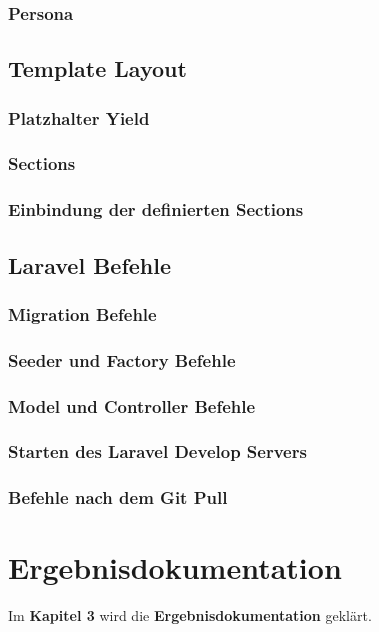 \subsection{Persona}


\section{Template Layout}

\subsection{Platzhalter Yield}

\subsection{Sections}
\subsection{Einbindung der definierten Sections}


\section{Laravel Befehle}

\subsection{Migration Befehle}
\subsection{Seeder und Factory Befehle}
\subsection{Model und Controller Befehle}
\subsection{Starten des Laravel Develop Servers}
\subsection{Befehle nach dem Git Pull} 



\chapter{Ergebnisdokumentation }
Im \textbf{Kapitel 3} wird die \textbf{Ergebnisdokumentation} geklärt.

